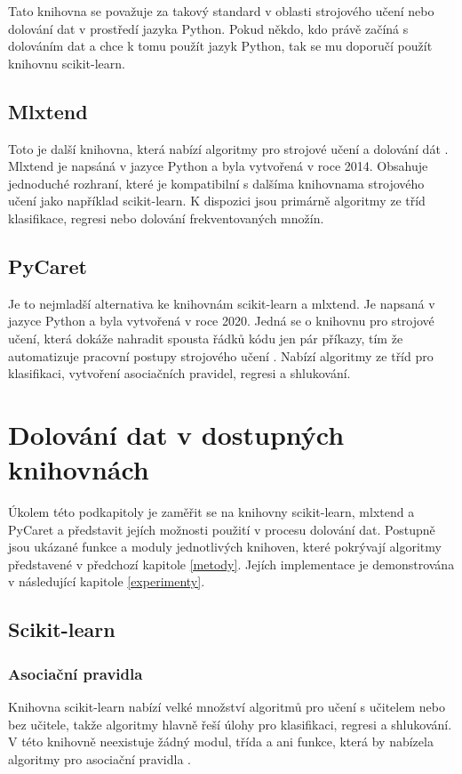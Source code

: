 Tato knihovna se považuje za takový standard v oblasti strojového učení nebo dolování dat v prostředí jazyka Python. Pokud někdo, kdo právě začíná s dolováním dat a chce k tomu použít jazyk Python, tak se mu doporučí použít knihovnu scikit-learn. 

\subsection*{Mlxtend}
Toto je další knihovna, která nabízí algoritmy pro strojové učení a dolování dát \cite{mlxtend}. Mlxtend je napsáná v jazyce Python a byla vytvořená v roce 2014. Obsahuje jednoduché rozhraní, které je kompatibilní s dalšíma knihovnama strojového učení jako například scikit-learn. K dispozici jsou primárně algoritmy ze tříd klasifikace, regresi nebo dolování frekventovaných množín.
\subsection*{PyCaret}
Je to nejmladší alternativa ke knihovnám scikit-learn a mlxtend. Je napsaná v jazyce Python a byla vytvořená v roce 2020. Jedná se o knihovnu pro strojové učení, která dokáže nahradit spousta řádků kódu jen pár příkazy, tím že automatizuje pracovní postupy strojového učení \cite{PyCaret}. Nabízí algoritmy ze tříd pro klasifikaci, vytvoření asociačních pravidel, regresi a shlukování.

\section{Dolování dat v dostupných knihovnách}
\label{knihovny_2}
Úkolem této podkapitoly je zaměřit se na knihovny scikit-learn, mlxtend a PyCaret a představit jejích možnosti použití v procesu dolování dat. Postupně jsou ukázané funkce a moduly jednotlivých knihoven, které pokrývají algoritmy představené v předchozí kapitole \ref{metody}. Jejích implementace je demonstrována v následující kapitole \ref{experimenty}.

\subsection{Scikit-learn}
\subsubsection*{Asociační pravidla}
Knihovna scikit-learn nabízí velké množství algoritmů pro učení s učitelem nebo bez učitele, takže algoritmy hlavně řeší úlohy pro klasifikaci, regresi a shlukování. V této knihovně neexistuje žádný modul, třída a ani funkce, která by nabízela algoritmy pro asociační pravidla \cite{Stancin}. 

